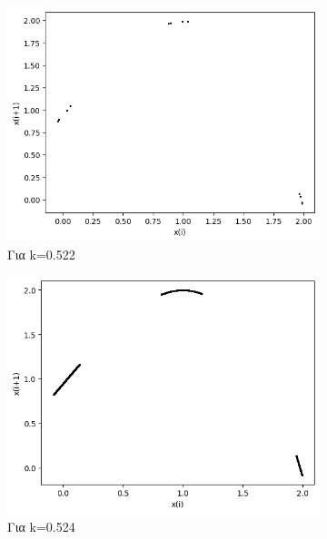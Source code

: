 \begin{figure}[h!]
\begin{subfigure}[b]{0.25\textwidth}
		\includegraphics[width=\textwidth]{LateX images/graphs/k0522}
		\caption{Για k=0.522}
		\label{f:k8}
	\end{subfigure}
	\hfill
	\begin{subfigure}[b]{0.25\textwidth}
		\centering
		\includegraphics[width=\textwidth]{LateX images/graphs/k0524}
		\caption{Για k=0.524}
		\label{f:k9}
	\end{subfigure}
	\hfill
	\begin{subfigure}[b]{0.25\textwidth}
		\centering

\end{subfigure}
\end{figure}
